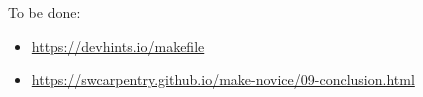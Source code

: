 \documentclass{charun}
\begin{document}
To be done:
\begin{itemize}
    \item \url{https://devhints.io/makefile}
    \item \url{https://swcarpentry.github.io/make-novice/09-conclusion.html}
\end{itemize}
\end{document}
